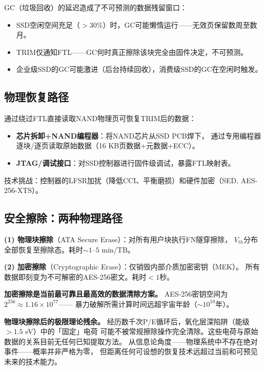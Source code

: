 \documentclass[11pt,a4paper,openany]{book}
\theoremstyle{definition}
\theoremstyle{plain}
\theoremstyle{remark}
\begin{document}
GC（垃圾回收）的延迟造成了不可预测的数据残留窗口：
\begin{itemize}
  \item SSD空闲空间充足（$>30\%$）时，GC可能懒惰运行——无效页保留数周至数月。
  \item TRIM仅通知FTL——GC何时真正擦除该块完全由固件决定，不可预测。
  \item 企业级SSD的GC可能激进（后台持续回收），消费级SSD的GC在空闲时触发。
\end{itemize}

\subsection{物理恢复路径}

通过绕过FTL直接读取NAND物理页可恢复TRIM后的数据：
\begin{itemize}
  \item \textbf{芯片拆卸+NAND编程器}：将NAND芯片从SSD PCB焊下，
  通过专用编程器逐块/逐页读取原始数据（16 KB页数据+元数据+ECC）。
  \item \textbf{JTAG/调试接口}：对SSD控制器进行固件级调试，暴露FTL映射表。
\end{itemize}

技术挑战：控制器的LFSR加扰（降低CCI、平衡磨损）和硬件加密（SED, AES-256-XTS）。

\subsection{安全擦除：两种物理路径}

\textbf{(1) 物理块擦除}（ATA Secure Erase）：对所有用户块执行FN隧穿擦除，
$V_{th}$分布全部恢复至擦除态。耗时$\sim 1$--$5$ min/TB。

\textbf{(2) 加密擦除}（Cryptographic Erase）：仅销毁内部介质加密密钥（MEK）。
所有数据即刻变为不可解密的AES-256密文。耗时$< 1$秒。

\textbf{加密擦除是当前最可靠且最高效的数据清除方案。}
AES-256密钥空间为$2^{256} \approx 1.16 \times 10^{77}$——
暴力破解所需计算时间远超宇宙年龄（$\sim 10^{10}$年）。

\begin{physbox}
\textbf{物理块擦除后的极限理论残余。}
经历数千次P/E循环后，氧化层深陷阱（能级$> 1.5$ eV）中的「固定」电荷
可能不被常规擦除操作完全清除。这些电荷与原始数据的关系目前无任何已知提取方法。
从信息论角度——物理系统中不存在绝对事件——概率并非严格为零，
但距离任何可设想的恢复技术远超过当前和可预见未来的技术能力。
\end{physbox}
\end{document}
